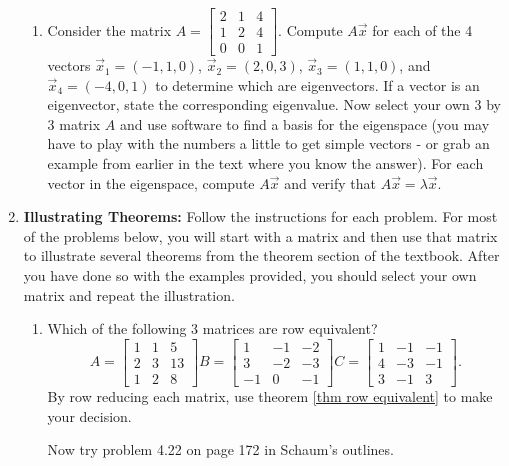 \begin{enumerate}
\begin{enumerate}
	\item 
Consider the matrix $A=\begin{bmatrix}2&1&4\\ 1&2&4\\ 0&0&1\end{bmatrix}$. Compute $A\vec x$ for each of the 4 vectors 
$\vec x_1 =(-1,1,0)$, $\vec x_2=(2,0,3)$, $\vec x_3=(1,1,0)$, and $\vec x_4=( -4,0,1)$ to determine which are eigenvectors. 
If a vector is an eigenvector, state the corresponding eigenvalue. 
Now select your own 3 by 3 matrix $A$ and use software to find a basis for the eigenspace (you may have to play with the numbers a little to get simple vectors - or grab an example from earlier in the text where you know the answer). For each vector in the eigenspace, compute $A\vec x$ and verify that $A\vec x = \lambda \vec x$. 



\end{enumerate}




\item \textbf{Illustrating Theorems:}  \label{theorem problems}
Follow the instructions for each problem.  For most of the problems below, you will start with a matrix and then use that matrix to illustrate several theorems from the theorem section of the textbook.  After you have done so with the examples provided, you should select your own matrix and repeat the illustration.

\begin{enumerate}
	\item Which of the following 3 matrices are row equivalent? 
	$$
	A = 
	\begin{bmatrix}
	1 & 1 & 5 \\
	2 & 3 & 13\\
	1 & 2 & 8
	\end{bmatrix}
	B = 
	\begin{bmatrix}
	1 & -1 & -2 \\
	3 & -2 & -3 \\
	-1& 0  & -1
	\end{bmatrix}
	C = 
	\begin{bmatrix}
	1 & -1 & -1 \\
	4 & -3 & -1 \\
	3 & -1 & 3	
	\end{bmatrix}.
	$$
	By row reducing each matrix, use theorem \ref{thm row equivalent} to make your decision. 
	
	Now try problem 4.22 on page 172 in Schaum's outlines.  
	 

\end{enumerate}
\end{enumerate}
